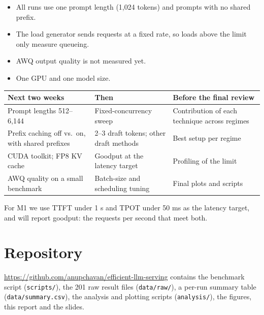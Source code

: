 \documentclass[11pt,a4paper]{article}
\begin{document}
\begin{itemize}
\item All runs use one prompt length (1,024 tokens) and prompts with no shared prefix.
\item The load generator sends requests at a fixed rate, so loads above the limit only measure queueing.
\item AWQ output quality is not measured yet.
\item One GPU and one model size.
\end{itemize}

\begin{tabularx}{\linewidth}{@{}XXX@{}}
\toprule
Next two weeks & Then & Before the final review\\
\midrule
Prompt lengths 512--6,144 & Fixed-concurrency sweep & Contribution of each technique across regimes\\
Prefix caching off vs.\ on, with shared prefixes & 2--3 draft tokens; other draft methods & Best setup per regime\\
CUDA toolkit; FP8 KV cache & Goodput at the latency target & Profiling of the limit\\
AWQ quality on a small benchmark & Batch-size and scheduling tuning & Final plots and scripts\\
\bottomrule
\end{tabularx}

For M1 we use TTFT under 1 s and TPOT under 50 ms as the latency target, and will report goodput: the requests per second that meet both.

\section{Repository}

\url{https://github.com/anupchavan/efficient-llm-serving} contains the benchmark script (\texttt{scripts/}), the 201 raw result files (\texttt{data/raw/}), a per-run summary table (\texttt{data/summary.csv}), the analysis and plotting scripts (\texttt{analysis/}), the figures, this report and the slides.
\end{document}
